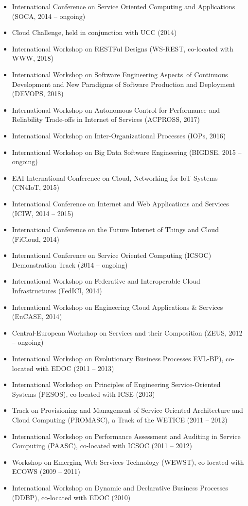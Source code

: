 \documentclass[paper=letter,fontsize=11pt]{scrartcl} %
\begin{document}
\begin{itemize}
  \item International Conference on Service Oriented Computing and Applications (SOCA, 2014 -- ongoing)
	\item Cloud Challenge, held in conjunction with UCC (2014)
	\item International Workshop on RESTFul Designs (WS-REST, co-located with WWW, 2018)
	\item International Workshop on Software Engineering Aspects of Continuous Development and New Paradigms of Software Production and Deployment (DEVOPS, 2018)
  \item International Workshop on Autonomous Control for Performance and Reliability Trade-offs in Internet of Services (ACPROSS, 2017)
	\item International Workshop on Inter-Organizational Processes (IOPs, 2016)
    \item  International Workshop on Big Data Software Engineering (BIGDSE, 2015 -- ongoing)
  \item EAI International Conference on Cloud, Networking for IoT Systems (CN4IoT, 2015)
  \item International Conference on Internet and Web Applications and Services (ICIW, 2014 -- 2015)
  \item International Conference on the Future Internet of Things and Cloud (FiCloud, 2014)
    \item International Conference on Service Oriented Computing (ICSOC) Demonstration Track (2014 -- ongoing)
    \item International Workshop on Federative and Interoperable Cloud Infrastructures (FedICI, 2014)
    \item International Workshop on Engineering Cloud Applications \& Services (EnCASE, 2014)
  \item Central-European Workshop on Services and their Composition (ZEUS, 2012 -- ongoing)
  \item International Workshop on Evolutionary Business Processes EVL-BP), co-located with EDOC (2011 -- 2013)
  \item International Workshop on Principles of Engineering Service-Oriented Systems (PESOS), co-located with ICSE (2013)
  \item Track on Provisioning and Management of Service Oriented Architecture and Cloud Computing (PROMASC), a Track of the WETICE (2011 -- 2012)
  \item International Workshop on Performance Assessment and Auditing in Service Computing (PAASC), co-located with ICSOC (2011 -- 2012)
  \item Workshop on Emerging Web Services Technology (WEWST), co-located
  with ECOWS (2009 -- 2011)
  \item International Workshop on Dynamic and Declarative Business
  Processes (DDBP), co-located with EDOC (2010)
\end{itemize}
\end{document}
